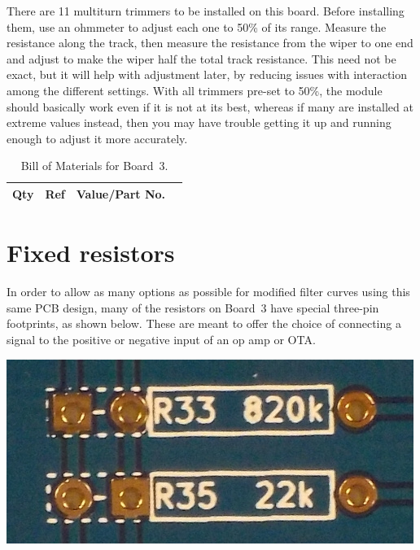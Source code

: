 There are 11 multiturn trimmers to be installed on this board.  Before
installing them, use an ohmmeter to adjust each one to 50\% of its range. 
Measure the resistance along the track, then measure the resistance from the
wiper to one end and adjust to make the wiper half the total track
resistance.  This need not be exact, but it will help with adjustment later,
by reducing issues with interaction among the different settings.  With all
trimmers pre-set to 50\%, the module should basically work even if it is not
at its best, whereas if many are installed at extreme values instead, then
you may have trouble getting it up and running enough to adjust it more
accurately.

\begin{table}
{\centering
{}
\vspace{\baselineskip}

\begin{tabular}{rp{1in}cp{3in}}
  \textbf{Qty} & \textbf{Ref} & \textbf{Value/Part No.} & \\ \hline

\end{tabular}\par}
\caption{Bill of Materials for Board~3.}\label{tab:b3bom}
\end{table}

\section{Fixed resistors}

In order to allow as many options as possible for modified filter curves
using this same PCB design, many of the resistors on Board~3 have special
three-pin footprints, as shown below.  These are meant to offer the choice
of connecting a signal to the positive or negative input of an op amp or
OTA.

\noindent\includegraphics[width=\linewidth]{optres-empty.jpg}

